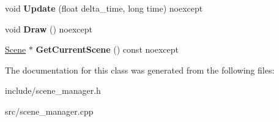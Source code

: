 \begin{DoxyCompactItemize}
\item 
\mbox{\label{class_blade_1_1_scene_manager_a68f1c083b875be3634870758ee697792}} 
void {\bfseries Update} (float delta\+\_\+time, long time) noexcept
\item 
\mbox{\label{class_blade_1_1_scene_manager_a6e393993821909643377f638766a3cf9}} 
void {\bfseries Draw} () noexcept
\item 
\mbox{\label{class_blade_1_1_scene_manager_a52232b73f5749916a22b6cf01707140e}} 
\hyperlink{class_blade_1_1_scene}{Scene} $\ast$ {\bfseries Get\+Current\+Scene} () const noexcept
\end{DoxyCompactItemize}


The documentation for this class was generated from the following files\+:\begin{DoxyCompactItemize}
\item 
include/scene\+\_\+manager.\+h\item 
src/scene\+\_\+manager.\+cpp\end{DoxyCompactItemize}
